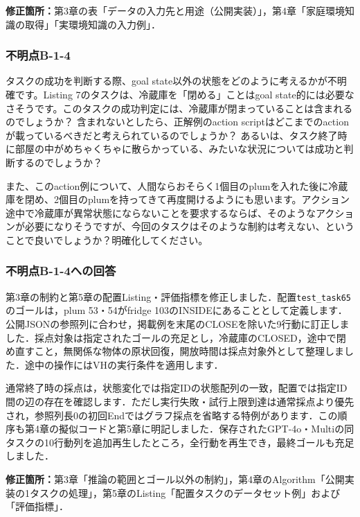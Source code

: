 \documentclass{jsarticle}
\begin{document}
\noindent\textbf{修正箇所：}第3章の表「データの入力先と用途（公開実装）」，第4章「家庭環境知識の取得」「実環境知識の入力例」．


\subsubsection*{不明点B-1-4}
\begin{screen}
タスクの成功を判断する際、goal state以外の状態をどのように考えるかが不明確です。Listing 7のタスクは、冷蔵庫を「閉める」ことはgoal state的には必要なさそうです。このタスクの成功判定には、冷蔵庫が閉まっていることは含まれるのでしょうか？ 含まれないとしたら、正解例のaction scriptはどこまでのactionが載っているべきだと考えられているのでしょうか？ あるいは、タスク終了時に部屋の中がめちゃくちゃに散らかっている、みたいな状況については成功と判断するのでしょうか？

また、このaction例について、人間ならおそらく1個目のplumを入れた後に冷蔵庫を閉め、2個目のplumを持ってきて再度開けるようにも思います。アクション途中で冷蔵庫が異常状態にならないことを要求するならば、そのようなアクションが必要になりそうですが、今回のタスクはそのような制約は考えない、ということで良いでしょうか？明確化してください。
\end{screen}

\subsubsection*{不明点B-1-4への回答}
第3章の制約と第5章の配置Listing・評価指標を修正しました．配置\texttt{test\_task65}のゴールは，plum 53・54がfridge 103のINSIDEにあることとして定義します．公開JSONの参照列に合わせ，掲載例を末尾のCLOSEを除いた9行動に訂正しました．採点対象は指定されたゴールの充足とし，冷蔵庫のCLOSED，途中で閉め直すこと，無関係な物体の原状回復，開放時間は採点対象外として整理しました．途中の操作にはVHの実行条件を適用します．

通常終了時の採点は，状態変化では指定IDの状態配列の一致，配置では指定ID間の辺の存在を確認します．ただし実行失敗・試行上限到達は通常採点より優先され，参照列長0の初回Endではグラフ採点を省略する特例があります．この順序も第4章の擬似コードと第5章に明記しました．保存されたGPT-4o・Multiの同タスクの10行動列を追加再生したところ，全行動を再生でき，最終ゴールも充足しました．

\noindent\textbf{修正箇所：}第3章「推論の範囲とゴール以外の制約」，第4章のAlgorithm「公開実装の1タスクの処理」，第5章のListing「配置タスクのデータセット例」および「評価指標」．
\end{document}
